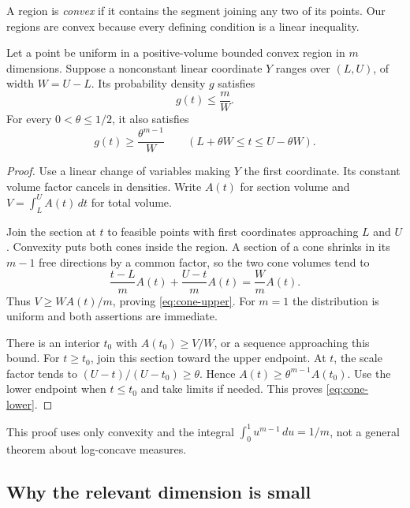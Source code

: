 A region is \emph{convex} if it contains the segment joining any two of its points. Our regions are convex because every defining condition is a linear inequality.

\begin{lemma}\label{lem:cone}
Let a point be uniform in a positive-volume bounded convex region in $m$ dimensions. Suppose a nonconstant linear coordinate $Y$ ranges over $(L,U)$, of width $W=U-L$. Its probability density $g$ satisfies
\begin{equation}\label{eq:cone-upper}
g(t)\le\frac mW.
\end{equation}
For every $0<\theta\le1/2$, it also satisfies
\begin{equation}\label{eq:cone-lower}
g(t)\ge\frac{\theta^{m-1}}W
\qquad(L+\theta W\le t\le U-\theta W).
\end{equation}
\end{lemma}
\begin{proof}
Use a linear change of variables making $Y$ the first coordinate. Its constant volume factor cancels in densities. Write $A(t)$ for section volume and $V=\int_L^U A(t)\,dt$ for total volume.

Join the section at $t$ to feasible points with first coordinates approaching $L$ and $U$. Convexity puts both cones inside the region. A section of a cone shrinks in its $m-1$ free directions by a common factor, so the two cone volumes tend to
\[
\frac{t-L}{m}A(t)+\frac{U-t}{m}A(t)=\frac Wm A(t).
\]
Thus $V\ge WA(t)/m$, proving \eqref{eq:cone-upper}. For $m=1$ the distribution is uniform and both assertions are immediate.

There is an interior $t_0$ with $A(t_0)\ge V/W$, or a sequence approaching this bound. For $t\ge t_0$, join this section toward the upper endpoint. At $t$, the scale factor tends to $(U-t)/(U-t_0)\ge\theta$. Hence $A(t)\ge\theta^{m-1}A(t_0)$. Use the lower endpoint when $t\le t_0$ and take limits if needed. This proves \eqref{eq:cone-lower}.
\end{proof}

This proof uses only convexity and the integral $\int_0^1 u^{m-1}\,du=1/m$, not a general theorem about log-concave measures.

\subsection{Why the relevant dimension is small}

